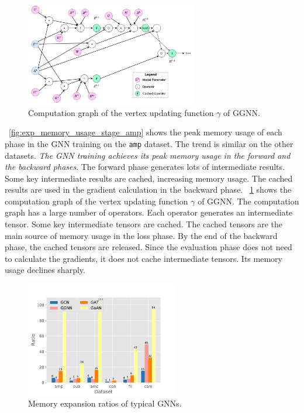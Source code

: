 \begin{figure}
    \centering
    \includegraphics[height=4.5cm]{figs/illustration/ggnn_vertex_func_computation_graph.pdf}
    \caption{Computation graph of the vertex updating function $\gamma$ of GGNN.}
    \label{fig:ggnn_vertex_func_computation_graph}
\end{figure}

\figurename~\ref{fig:exp_memory_usage_stage_amp} shows the peak memory usage of each phase in the GNN training on the \texttt{amp} dataset.
The trend is similar on the other datasets.
\emph{The GNN training achieves its peak memory usage in the forward and the backward phases}.
The forward phase generates lots of intermediate results.
Some key intermediate results are cached, increasing memory usage.
The cached results are used in the gradient calculation in the backward phase.
\figurename~\ref{fig:ggnn_vertex_func_computation_graph} shows the computation graph of the vertex updating function $\gamma$ of GGNN.
The computation graph has a large number of operators. Each operator generates an intermediate tensor.
Some key intermediate tensors are cached.
The cached tensors are the main source of memory usage in the loss phase.
By the end of the backward phase, the cached tensors are released.
Since the evaluation phase does not need to calculate the gradients, it does not cache intermediate tensors.
Its memory usage declines sharply.

\begin{figure}
    \centering
    \includegraphics[height=5cm]{figs/experiments/exp_memory_expansion_ratio.pdf}
    \caption{Memory expansion ratios of typical GNNs.}
    \label{fig:exp_memory_expansion_ratio}
\end{figure}

